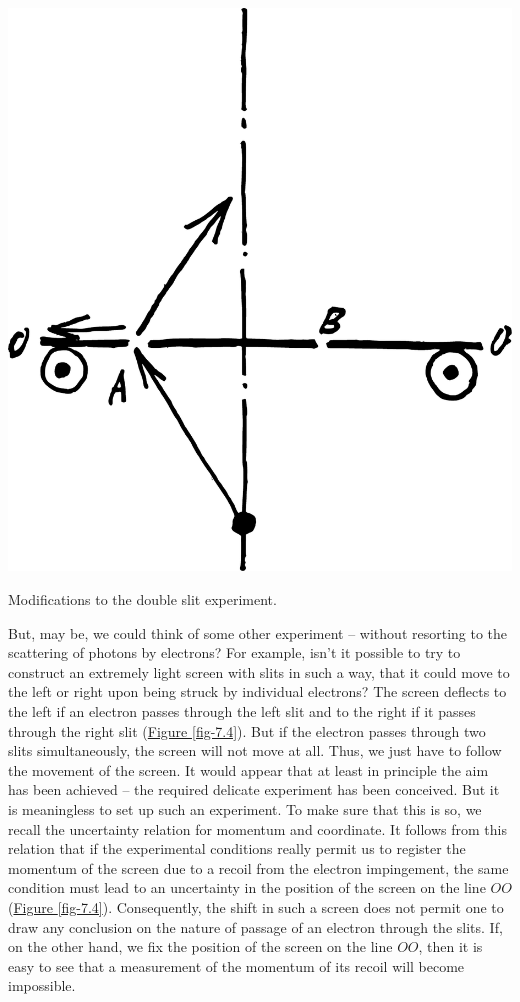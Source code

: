 \documentclass[a4paper,sfsidenotes,colorlinks=true]{tufte-book}
\numberwithin{equation}{section}
\numberwithin{figure}{section}
\begin{document}
\begin{marginfigure}[1cm]
\centering
\includegraphics[width=\textwidth]{figures/fig-07-04.pdf}
\caption{Modifications to the double slit experiment.}
\label{fig-7.4}
\end{marginfigure}

But, may be, we could think of some other experiment -- without resorting to the scattering of photons by electrons? For example, isn't it possible to try to construct an extremely light screen with slits in such a way, that it could move to the left or right upon being struck by individual electrons? The screen deflects to the left if an electron passes through the left slit and to the right if it passes through the right slit (\hyperref[fig-7.4]{Figure \ref{fig-7.4}}). But if the electron passes through two slits simultaneously, the screen will not move at all. Thus, we just have to follow the movement of the screen. It would appear that at least in principle the aim has been achieved -- the required delicate experiment has been conceived. But it is meaningless to set up such an experiment. To make sure that this is so, we recall the uncertainty relation for momentum and coordinate. It follows from this relation that if the experimental conditions really permit us to register the momentum of the screen due to a recoil from the electron impingement, the same condition must lead to an uncertainty in the position of the screen on the line $OO$ (\hyperref[fig-7.4]{Figure \ref{fig-7.4}}). Consequently, the shift in such a screen does not permit one to draw any conclusion on the nature of passage of an electron through the slits. If, on the other hand, we fix the position of the screen on the line $OO$, then it is easy to see that a measurement of the momentum of its recoil will become impossible.
\end{document}
